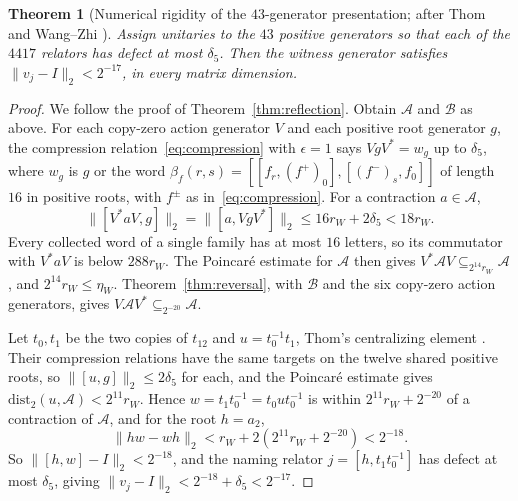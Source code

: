 \documentclass[11pt]{article}
\newtheorem{theorem}{Theorem}[section]
\begin{document}
\begin{theorem}[Numerical rigidity of the $43$-generator presentation; after Thom {\cite[Section~5.2]{Thom26}} and Wang--Zhi {\cite[Theorem~5.2]{WangZhi26}}]\label{thm:f5rigidity}
Assign unitaries to the $43$ positive generators so that each of the $4417$ relators has defect at most $\delta_5$.  Then the witness generator satisfies $\|v_j-I\|_2<2^{-17}$, in every matrix dimension.
\end{theorem}
\begin{proof}
We follow the proof of Theorem~\ref{thm:reflection}.  Obtain $\mathcal A$ and $\mathcal B$ as above.  For each copy-zero action generator $V$ and each positive root generator $g$, the compression relation~\eqref{eq:compression} with $\epsilon=1$ says $VgV^*=w_g$ up to $\delta_5$, where $w_g$ is $g$ or the word $\beta_f(r,s)=[[f_r,(f^+)_0],[(f^-)_s,f_0]]$ of length $16$ in positive roots, with $f^\pm$ as in~\eqref{eq:compression}.  For a contraction $a\in\mathcal A$,
\[
 \|[V^*aV,g]\|_2=\|[a,VgV^*]\|_2\le16r_W+2\delta_5<18r_W.
\]
Every collected word of a single family has at most $16$ letters, so its commutator with $V^*aV$ is below $288r_W$.  The Poincar\'e estimate for $\mathcal A$ then gives $V^*\mathcal AV\subseteq_{2^{14}r_W}\mathcal A$, and $2^{14}r_W\le\eta_W$.  Theorem~\ref{thm:reversal}, with $\mathcal B$ and the six copy-zero action generators, gives $V\mathcal AV^*\subseteq_{2^{-20}}\mathcal A$.

Let $t_0,t_1$ be the two copies of $t_{12}$ and $u=t_0^{-1}t_1$, Thom's centralizing element \cite[Section~5.2]{Thom26}.  Their compression relations have the same targets on the twelve shared positive roots, so $\|[u,g]\|_2\le2\delta_5$ for each, and the Poincar\'e estimate gives $\mathrm{dist}_2(u,\mathcal A)<2^{11}r_W$.  Hence $w=t_1t_0^{-1}=t_0ut_0^{-1}$ is within $2^{11}r_W+2^{-20}$ of a contraction of $\mathcal A$, and for the root $h=a_2$,
\[
 \|hw-wh\|_2<r_W+2(2^{11}r_W+2^{-20})<2^{-18}.
\]
So $\|[h,w]-I\|_2<2^{-18}$, and the naming relator $j=[h,t_1t_0^{-1}]$ has defect at most $\delta_5$, giving $\|v_j-I\|_2<2^{-18}+\delta_5<2^{-17}$.
\end{proof}
\end{document}
